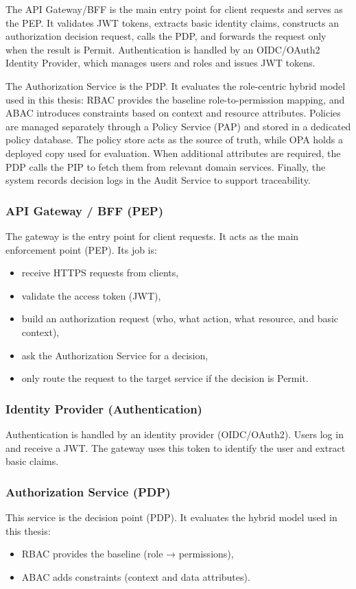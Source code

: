 The API Gateway/BFF is the main entry point for client requests and serves as the PEP. It validates JWT tokens, extracts basic identity claims, constructs an authorization decision request, calls the PDP, and forwards the request only when the result is Permit. Authentication is handled by an OIDC/OAuth2 Identity Provider, which manages users and roles and issues JWT tokens.
\vspace{0.5cm}


The Authorization Service is the PDP. It evaluates the role-centric hybrid model used in this thesis: RBAC provides the baseline role-to-permission mapping, and ABAC introduces constraints based on context and resource attributes. Policies are managed separately through a Policy Service (PAP) and stored in a dedicated policy database. The policy store acts as the source of truth, while OPA holds a deployed copy used for evaluation. When additional attributes are required, the PDP calls the PIP to fetch them from relevant domain services. Finally, the system records decision logs in the Audit Service to support traceability.

\subsubsection{API Gateway / BFF (PEP)}
The gateway is the entry point for client requests. It acts as the main enforcement point (PEP). Its job is:
\begin{itemize}
    \item receive HTTPS requests from clients,
    \item validate the access token (JWT),
    \item build an authorization request (who, what action, what resource, and basic context),
    \item ask the Authorization Service for a decision,
    \item only route the request to the target service if the decision is Permit.
\end{itemize}

\subsubsection{Identity Provider (Authentication)}
Authentication is handled by an identity provider (OIDC/OAuth2). Users log in and receive a JWT. The gateway uses this token to identify the user and extract basic claims.
\subsubsection{Authorization Service (PDP)}
This service is the decision point (PDP). It evaluates the hybrid model used in this thesis:
\begin{itemize}
    \item RBAC provides the baseline (role → permissions),
    \item ABAC adds constraints (context and data attributes).
\end{itemize}

